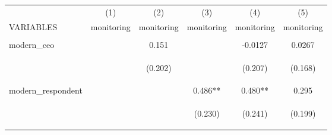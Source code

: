 \begin{center}
\begin{tabular}{lccccc} \hline
 & (1) & (2) & (3) & (4) & (5) \\
VARIABLES & monitoring & monitoring & monitoring & monitoring & monitoring \\ \hline
\vspace{4pt} & \begin{footnotesize}\end{footnotesize} & \begin{footnotesize}\end{footnotesize} & \begin{footnotesize}\end{footnotesize} & \begin{footnotesize}\end{footnotesize} & \begin{footnotesize}\end{footnotesize} \\
modern\_ceo &  & 0.151 &  & -0.0127 & 0.0267 \\
\vspace{4pt} & \begin{footnotesize}\end{footnotesize} & \begin{footnotesize}(0.202)\end{footnotesize} & \begin{footnotesize}\end{footnotesize} & \begin{footnotesize}(0.207)\end{footnotesize} & \begin{footnotesize}(0.168)\end{footnotesize} \\
modern\_respondent &  &  & 0.486** & 0.480** & 0.295 \\
\vspace{4pt} & \begin{footnotesize}\end{footnotesize} & \begin{footnotesize}\end{footnotesize} & \begin{footnotesize}(0.230)\end{footnotesize} & \begin{footnotesize}(0.241)\end{footnotesize} & \begin{footnotesize}(0.199)\end{footnotesize} \\

\end{tabular}
\end{center}
